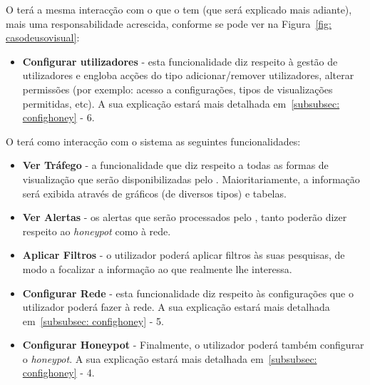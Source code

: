 O \admini terá a mesma interacção com o \visualz que o \uticomum tem (que será explicado mais adiante), mais uma responsabilidade acrescida, 
conforme se pode ver na Figura~\ref{fig: casodeusovisual}:

\begin{itemize}
 \item \textbf{Configurar utilizadores} - esta funcionalidade diz respeito à gestão de utilizadores e engloba acções do tipo adicionar/remover utilizadores, 
 alterar permissões (por exemplo: acesso a configurações, tipos de visualizações permitidas, etc). A sua explicação estará mais detalhada em~\ref{subsubsec: confighoney} - 6.
\end{itemize}

O \uticomum terá como interacção com o sistema as seguintes funcionalidades:

\begin{itemize}
 \item \textbf{Ver Tráfego} - a funcionalidade que diz respeito a todas as formas de visualização que serão disponibilizadas pelo \visualz. Maioritariamente, a informação será exibida através de gráficos (de diversos tipos) e tabelas.
 \item \textbf{Ver Alertas} - os alertas que serão processados pelo \visualz, tanto poderão dizer respeito ao \emph{honeypot} como à rede.
 \item \textbf{Aplicar Filtros} - o utilizador poderá aplicar filtros às suas pesquisas, de modo a focalizar a informação ao que realmente lhe interessa.
 \item \textbf{Configurar Rede} - esta funcionalidade diz respeito às configurações que o utilizador poderá fazer à rede. A sua explicação estará mais detalhada em~\ref{subsubsec: confighoney} - 5.
 \item \textbf{Configurar Honeypot} - Finalmente, o utilizador poderá também configurar o \emph{honeypot}. A sua explicação estará mais detalhada em~\ref{subsubsec: confighoney} - 4.
\end{itemize}

